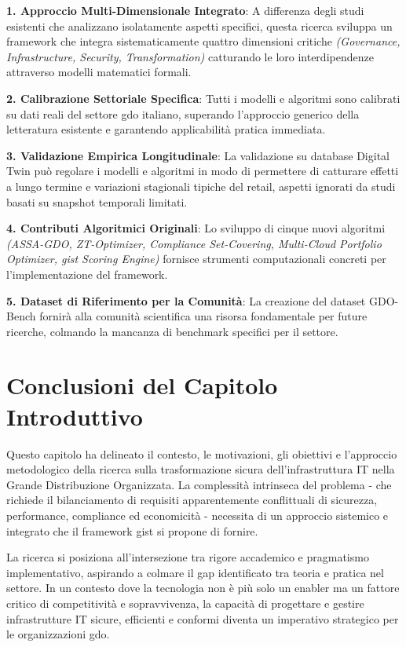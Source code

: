 \textbf{1. Approccio Multi-Dimensionale Integrato}: A differenza degli studi esistenti che analizzano isolatamente aspetti specifici, questa ricerca sviluppa un framework che integra sistematicamente quattro dimensioni critiche \emph{(Governance, Infrastructure, Security, Transformation)} catturando le loro interdipendenze attraverso modelli matematici formali.

\textbf{2. Calibrazione Settoriale Specifica}: Tutti i modelli e algoritmi sono calibrati su dati reali del settore \gls{gdo} italiano, superando l'approccio generico della letteratura esistente e garantendo applicabilità pratica immediata.

\textbf{3. Validazione Empirica Longitudinale}: La validazione su database Digital Twin può regolare i modelli e algoritmi in modo di permettere di catturare effetti a lungo termine e variazioni stagionali tipiche del retail, aspetti ignorati da studi basati su snapshot temporali limitati.

\textbf{4. Contributi Algoritmici Originali}: Lo sviluppo di cinque nuovi algoritmi \emph{(ASSA-GDO, ZT-Optimizer, Compliance Set-Covering, Multi-Cloud Portfolio Optimizer, \gls{gist} Scoring Engine)} fornisce strumenti computazionali concreti per l'implementazione del framework.

\textbf{5. Dataset di Riferimento per la Comunità}: La creazione del dataset GDO-Bench fornirà alla comunità scientifica una risorsa fondamentale per future ricerche, colmando la mancanza di benchmark specifici per il settore.

\section{Conclusioni del Capitolo Introduttivo}
\label{sec:conclusioni_cap1}

Questo capitolo ha delineato il contesto, le motivazioni, gli obiettivi e l'approccio metodologico della ricerca sulla trasformazione sicura dell'infrastruttura IT nella Grande Distribuzione Organizzata. La complessità intrinseca del problema - che richiede il bilanciamento di requisiti apparentemente conflittuali di sicurezza, performance, compliance ed economicità - necessita di un approccio sistemico e integrato che il framework \gls{gist} si propone di fornire.

La ricerca si posiziona all'intersezione tra rigore accademico e pragmatismo implementativo, aspirando a colmare il gap identificato tra teoria e pratica nel settore. In un contesto dove la tecnologia non è più solo un enabler ma un fattore critico di competitività e sopravvivenza, la capacità di progettare e gestire infrastrutture IT sicure, efficienti e conformi diventa un imperativo strategico per le organizzazioni \gls{gdo}.

